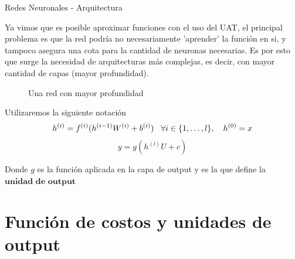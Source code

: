 \documentclass[9pt]{beamer}
\begin{document}
\begin{frame}{Redes Neuronales - Arquitectura}

Ya vimos que es posible aproximar funciones con el uso del UAT, el principal problema es que la red podría no necesariamente 'aprender' la función en si, y tampoco asegura una cota para la cantidad de neuronas necesarias. Es por esto que surge la necesidad de arquitecturas más complejas, es decir, con mayor cantidad de capas (mayor profundidad). \pause

\begin{figure}[H]
  \centering
  \caption{Una red con mayor profundidad}
\end{figure}

\pause 

Utilizaremos la siguiente notación 
\begin{equation}
h^{(i)} = f^{(i)}(h^{(i-1)}W^{(i)} + b^{(i)}) \hspace{0.3cm} \forall i \in \{1 ,\dots, l\}, \quad h^{(0)}=x
\end{equation}
\begin{equation}
y = g(h^{(l)}U + c)
\end{equation}

Donde $g$ es la función aplicada en la capa de output y es la que define la $\textbf{unidad de output}$

\end{frame}

\section{Función de costos y unidades de output}
\end{document}
